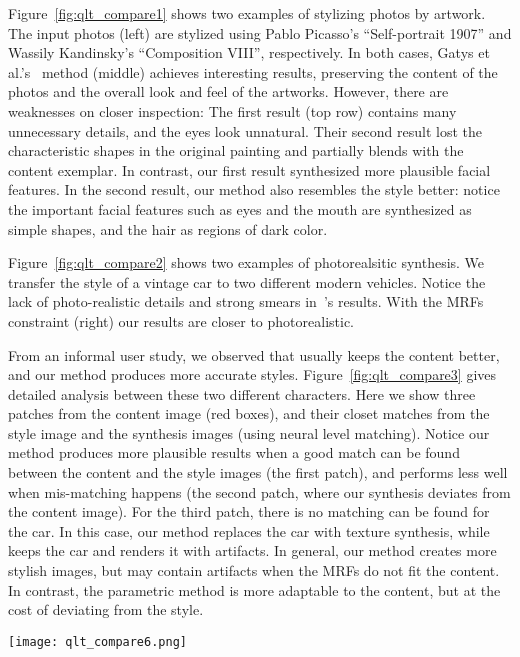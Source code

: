 \documentclass[10pt,twocolumn,letterpaper]{article}
\begin{document}
Figure~\ref{fig:qlt_compare1} shows two examples of stylizing photos by artwork. The input photos (left) are stylized using Pablo Picasso's ``Self-portrait 1907'' and Wassily Kandinsky's ``Composition VIII'', respectively. In both cases, Gatys et al.'s~\cite{Gatys15} method (middle) achieves interesting results, preserving the content of the photos and the overall look and feel of the artworks. However, there are weaknesses on closer inspection: The first result (top row) contains many unnecessary details, and the eyes look unnatural. Their second result lost the characteristic shapes in the original painting and partially blends with the content exemplar. In contrast, our first result synthesized more plausible facial features. In the second result, our method also resembles the style better: notice the important facial features such as eyes and the mouth are synthesized as simple shapes, and the hair as regions of dark color.

Figure~\ref{fig:qlt_compare2} shows two examples of photorealsitic synthesis. We transfer the style of a vintage car to two different modern vehicles. Notice the lack of photo-realistic details and strong smears in~\cite{Gatys15}'s results. With the MRFs constraint (right) our results are closer to photorealistic.

From an informal user study, we observed that \cite{Gatys15} usually keeps the content better, and our method produces more accurate styles. Figure~\ref{fig:qlt_compare3} gives detailed analysis between these two different characters. Here we show three patches from the content image (red boxes), and their closet matches from the style image and the synthesis images (using neural level matching). Notice our method produces more plausible results when a good match can be found between the content and the style images (the first patch), and performs less well when mis-matching happens (the second patch, where our synthesis deviates from the content image). For the third patch, there is no matching can be found for the car. In this case, our method replaces the car with texture synthesis, while \cite{Gatys15} keeps the car and renders it with artifacts. In general, our method creates more stylish images, but may contain artifacts when the MRFs do not fit the content. In contrast, the parametric method \cite{Gatys15} is more adaptable to the content, but at the cost of deviating from the style.

\begin{figure*}[ht]
	\centering
	\texttt{[image: qlt\_compare6.png]}
	\caption{Comparison with Gatys et al.~\cite{Gatys15} for photo-realistic synthesis. Input images credited to flickr users \emph{Brett Levin}, \emph{Axion23} and \emph{Tim Dobbelaere}.}\label{fig:qlt_compare2}
\end{figure*}
\end{document}
